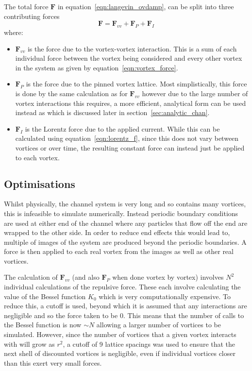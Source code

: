 \documentclass{article}
\numberwithin{equation}{section}
\begin{document}
The total force $\mathbf{F}$ in equation~\ref{eqn:langevin_ovdamp}, can be split into three contributing forces
\begin{equation}
    \mathbf{F} = \mathbf{F}_{vv} + \mathbf{F}_P + \mathbf{F}_I
\end{equation}
where:
\begin{itemize}
    \item $\mathbf{F}_{vv}$ is the force due to the vortex-vortex interaction. This is a sum of each individual force between the vortex being considered and every other vortex in the system as given by equation~\ref{eqn:vortex_force}.
    \item $\mathbf{F}_P$ is the force due to the pinned vortex lattice. Most simplistically, this force is done by the same calculation as for $\mathbf{F}_{vv}$ however due to the large number of vortex interactions this requires, a more efficient, analytical form can be used instead as which is discussed later in section~\ref{sec:analytic_chan}.
    \item $\mathbf{F}_I$ is the Lorentz force due to the applied current. While this can be calculated using equation~\ref{eqn:lorentz_f}, since this does not vary between vortices or over time, the resulting constant force can instead just be applied to each vortex.
\end{itemize}

\subsection{Optimisations}
Whilst physically, the channel system is very long and so contains many vortices, this is infeasible to simulate numerically. Instead periodic boundary conditions are used at either end of the channel where any particles that flow off the end are wrapped to the other side. In order to reduce end effects this would lead to, multiple of images of the system are produced beyond the periodic boundaries. A force is then applied to each real vortex from the images as well as other real vortices.

The calculation of $\mathbf{F}_{vv}$ (and also $\mathbf{F}_P$ when done vortex by vortex) involves $N^2$ individual calculations of the repulsive force. These each involve calculating the value of the Bessel function $K_0$ which is very computationally expensive. To reduce this, a cutoff is used, beyond which it is assumed that any interactions are negligible and so the force taken to be 0. This means that the number of calls to the Bessel function is now $\sim N$ allowing a larger number of vortices to be simulated. However, since the number of vortices that a given vortex interacts with will grow as $r^2$, a cutoff of 9 lattice spacings was used to ensure that the next shell of discounted vortices is negligible, even if individual vortices closer than this exert very small forces.
\end{document}
